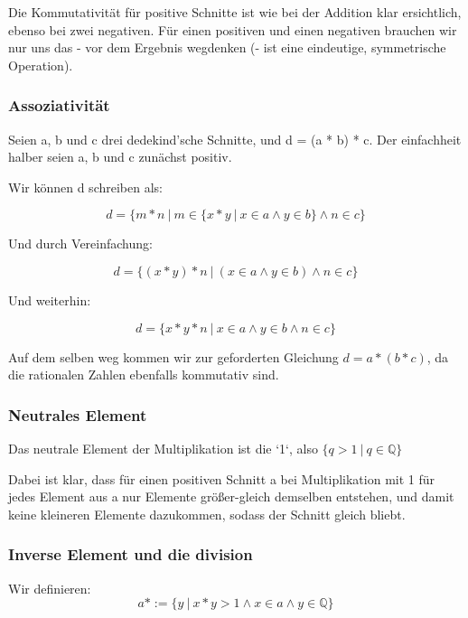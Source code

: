 \documentclass[12pt]{article}
\begin{document}
    Die Kommutativität für positive Schnitte ist wie bei der Addition klar ersichtlich, ebenso bei zwei negativen.
    Für einen positiven und einen negativen brauchen wir nur uns das - vor dem Ergebnis wegdenken
    (- ist eine eindeutige, symmetrische Operation).

    \subsubsection{Assoziativität}

    Seien a, b und c drei dedekind'sche Schnitte, und d = (a * b) * c.
    Der einfachheit halber seien a, b und c zunächst positiv.

    Wir können d schreiben als:

    \[d = \{m * n \mspace{4mu} | \mspace{4mu} m \in \{x * y \mspace{4mu} | \mspace{4mu} x \in a \land y \in b\} \land n \in c\}\]

    Und durch Vereinfachung:

    \[d = \{(x * y) * n \mspace{4mu} | \mspace{4mu} (x \in a \land y \in b) \land n \in c\}\]

    Und weiterhin:

    \[d = \{x * y * n \mspace{4mu} | \mspace{4mu} x \in a \land y \in b \land n \in c\}\]

    Auf dem selben weg kommen wir zur geforderten Gleichung $d = a * (b * c)$, da die rationalen Zahlen
    ebenfalls kommutativ sind.

    \subsubsection{Neutrales Element}

    Das neutrale Element der Multiplikation ist die `1`, also $\{q > 1 \mspace{4mu} | \mspace{4mu} q \in \mathbb{Q}\}$

    Dabei ist klar, dass für einen positiven Schnitt a bei Multiplikation mit 1 für jedes Element aus a nur Elemente
    größer-gleich demselben entstehen, und damit keine kleineren Elemente dazukommen, sodass der Schnitt gleich
    bliebt.

    \subsubsection{Inverse Element und die division}

    Wir definieren:
    \[a* := \{y \mspace{4mu} | \mspace{4mu} x * y > 1 \land x \in a \land y \in \mathbb{Q}\}\]
\end{document}
